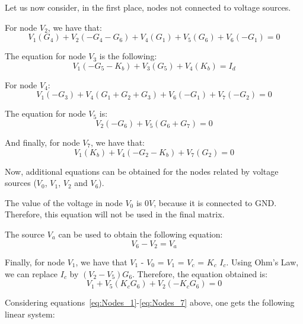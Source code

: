\par
\vspace{1mm}

Let us now consider, in the first place, nodes not connected to voltage sources.

\par

For node $V_2$, we have that:
\begin{equation}
  V_1(G_4)+V_2(-G_4-G_6)+V_4(G_1)+V_5(G_6)+V_6(-G_1)=0
  \label{eq:Nodes_1}
\end{equation}

The equation for node $V_3$ is the following:
\begin{equation}
  V_1(-G_5-K_b)+V_3(G_5)+V_4(K_b)=I_d
  \label{eq:Nodes_2}
\end{equation}

For node $V_4$:
\begin{equation}
  V_1(-G_3)+V_4(G_1+G_2+G_3)+V_6(-G_1)+V_7(-G_2)=0
  \label{eq:Nodes_3}
\end{equation}

The equation for node $V_5$ is:
\begin{equation}
  V_2(-G_6)+V_5(G_6+G_7)=0
  \label{eq:Nodes_4}
\end{equation}

And finally, for node $V_7$, we have that:
\begin{equation}
  V_1(K_b)+V_4(-G_2-K_b)+V_7(G_2)=0
  \label{eq:Nodes_5}
\end{equation}

Now, additional equations can be obtained for the nodes related by voltage sources ($V_0$, $V_1$, $V_2$ and $V_6$).
\par
The value of the voltage in node $V_0$ is $0 V$, because it is connected to GND. Therefore, this equation will not be used in the final matrix.
\par
The source $V_a$ can be used to obtain the following equation:
\begin{equation}
  V_6-V_2=V_a
  \label{eq:Nodes_6}
\end{equation}

Finally, for node $V_1$, we have that $V_1$ - $V_0$ = $V_1$ = $V_c$ = $K_c$ $I_c$. Using Ohm's Law, we can replace $I_c$ by $(V_2-V_5)G_6$. Therefore, the equation obtained is:
\begin{equation}
  V_1+V_5(K_cG_6)+V_2(-K_cG_6)=0
  \label{eq:Nodes_7}
\end{equation}

Considering equations~\ref{eq:Nodes_1}-\ref{eq:Nodes_7} above, one gets the following linear system:

